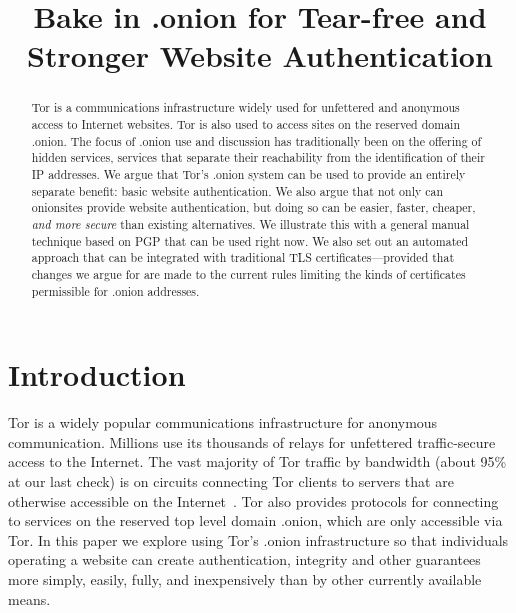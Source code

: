 \documentclass[10pt, conference, compsocconf]{styles/IEEEtran}
\title{Bake in .onion for Tear-free and Stronger Website Authentication}
\author{
\IEEEauthorblockN{Paul Syverson}
\IEEEauthorblockA{U.S. Naval Research Laboratory\\
paul.syverson@nrl.navy.mil}
\and
\IEEEauthorblockN{Griffin Boyce}
\IEEEauthorblockA{Berkman Center for Internet and Society\\
griffin@cryptolab.net}
}
\begin{document}
\maketitle

\begin{abstract}
  Tor is a communications infrastructure widely used for unfettered
  and anonymous access to Internet websites. Tor is also used to
  access sites on the reserved domain .onion.  The focus of .onion use
  and discussion has traditionally been on the offering of hidden
  services, services that separate their reachability from the
  identification of their IP addresses. We argue that Tor's .onion
  system can be used to provide an entirely separate benefit: basic
  website authentication. We also argue that not only can onionsites
  provide website authentication, but doing so can be easier, faster,
  cheaper, \emph{and more secure} than existing
  alternatives.  We illustrate this with a general manual technique
  based on PGP that can be used right now. We also set out an
  automated approach that can be integrated with traditional TLS
  certificates---provided that changes we argue for are made to the
  current rules limiting the kinds of certificates permissible for .onion
  addresses.  
\end{abstract}

% 
% 
% 
% 
% 
% 
% 
% 
% 
% 
% 

\section{Introduction}

Tor is a widely popular communications infrastructure for anonymous
communication. Millions use its thousands of relays for unfettered
traffic-secure access to the Internet. The vast majority of Tor
traffic by bandwidth (about 95\% at our last check) is on circuits
connecting Tor clients to servers that are otherwise
accessible on the Internet~\cite{hs-stats-report-2015}. Tor
also provides protocols for connecting to services on the
reserved top level domain .onion, which are only accessible via Tor.
In this paper we explore using Tor's .onion infrastructure so that
individuals operating a website can create authentication, integrity
and other guarantees more simply, easily, fully, and inexpensively
than by other currently available means.
\end{document}
